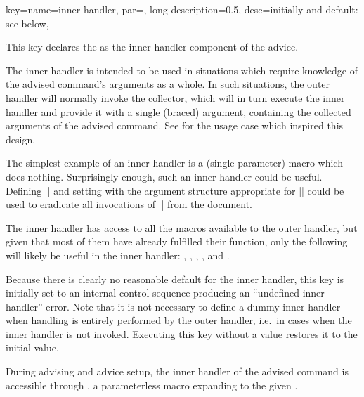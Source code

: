 \documentclass[a4paper,11pt]{article}
\begin{document}
\begin{doc}{
    key={name=inner handler, par=, long description=0.5,
      desc=initially and default: see below},
  }

  This key declares the  as the inner handler component
  of the advice.

  The inner handler is intended to be used in situations which require
  knowledge of the advised command's arguments as a whole.  In such situations,
  the outer handler will normally invoke the collector, which will in turn
  execute the inner handler and provide it with a single (braced) argument,
  containing the collected arguments of the advised command.  See
   for the usage case which inspired this design.

  The simplest example of an inner handler is a (single-parameter) macro which
  does nothing.  Surprisingly enough, such an inner handler could be useful.
  Defining |\def\Gobble#1{}| and setting
   with the argument structure
  appropriate for |\foo| could be used to eradicate all invocations of |\foo|
  from the document.

  The inner handler has access to all the macros available to the outer
  handler, but given that most of them have already fulfilled their function,
  only the following will likely be useful in the inner handler:
  , , ,
  , and .

  Because there is clearly no reasonable default for the inner handler, this key
  is initially set to an internal control sequence producing an ``undefined
  inner handler'' error.  Note that it is not necessary to define a dummy inner
  handler when handling is entirely performed by the outer handler, i.e.\ in
  cases when the inner handler is not invoked.  Executing this key without a
  value restores it to the initial value.
  
  During advising and advice setup, the inner handler of the advised command is
  accessible through , a parameterless macro
  expanding to the given .
\end{doc}
\end{document}
